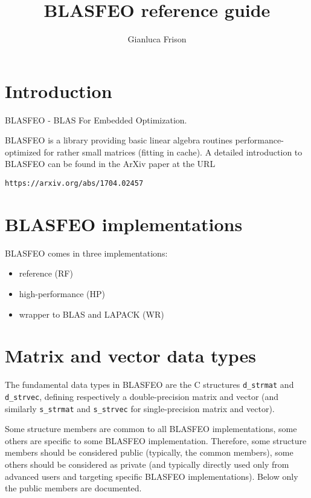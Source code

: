 \documentclass[a4paper]{report}
\title{BLASFEO reference guide}
\author{Gianluca Frison}
\begin{document}
\maketitle
\tableofcontents





\chapter{Introduction}

BLASFEO - BLAS For Embedded Optimization.

BLASFEO is a library providing basic linear algebra routines performance-optimized for rather small matrices (fitting in cache).
A detailed introduction to BLASFEO can be found in the ArXiv paper at the URL
\begin{verbatim}
https://arxiv.org/abs/1704.02457
\end{verbatim}





\chapter{BLASFEO implementations}

BLASFEO comes in three implementations:
\begin{itemize}
\item reference (RF)
\item high-performance (HP)
\item wrapper to BLAS and LAPACK (WR)
\end{itemize}




\chapter{Matrix and vector data types}

The fundamental data types in BLASFEO are the C structures {\tt d\_strmat} and {\tt d\_strvec}, defining respectively a double-precision matrix and vector (and similarly {\tt s\_strmat} and {\tt s\_strvec} for single-precision matrix and vector).

Some structure members are common to all BLASFEO implementations, some others are specific to some BLASFEO implementation.
Therefore, some structure members should be considered public (typically, the common members), some others should be considered as private (and typically directly used only from advanced users and targeting specific BLASFEO implementations).
Below only the public members are documented.
\end{document}
